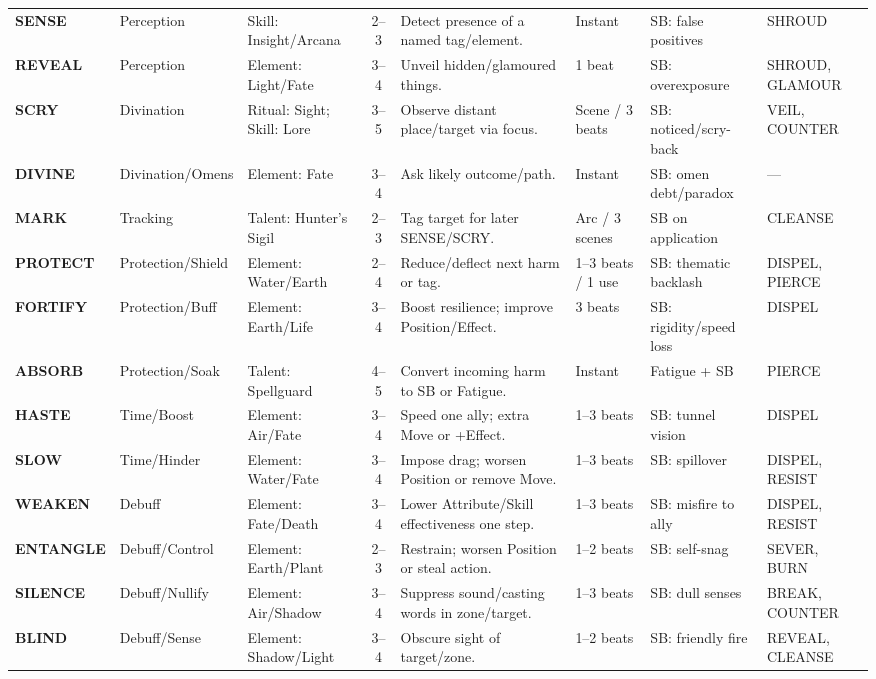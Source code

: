 \begin{longtable}{@{} l l p{4.2cm} c p{6.5cm} p{2.2cm} p{3.2cm} p{2.2cm} @{}}
\textbf{SENSE}     & Perception        & Skill: Insight/Arcana                & 2--3 & Detect presence of a named tag/element. & Instant & SB: false positives & SHROUD \\
\textbf{REVEAL}    & Perception        & Element: Light/Fate                  & 3--4 & Unveil hidden/glamoured things. & 1 beat & SB: overexposure & SHROUD, GLAMOUR \\
\textbf{SCRY}      & Divination        & Ritual: Sight; Skill: Lore           & 3--5 & Observe distant place/target via focus. & Scene / 3 beats & SB: noticed/scry-back & VEIL, COUNTER \\
\textbf{DIVINE}    & Divination/Omens  & Element: Fate                        & 3--4 & Ask likely outcome/path. & Instant & SB: omen debt/paradox & — \\
\textbf{MARK}      & Tracking          & Talent: Hunter’s Sigil               & 2--3 & Tag target for later SENSE/SCRY. & Arc / 3 scenes & SB on application & CLEANSE \\

\textbf{PROTECT}   & Protection/Shield & Element: Water/Earth                 & 2--4 & Reduce/deflect next harm or tag. & 1–3 beats / 1 use & SB: thematic backlash & DISPEL, PIERCE \\
\textbf{FORTIFY}   & Protection/Buff   & Element: Earth/Life                  & 3--4 & Boost resilience; improve Position/Effect. & 3 beats & SB: rigidity/speed loss & DISPEL \\
\textbf{ABSORB}    & Protection/Soak   & Talent: Spellguard                   & 4--5 & Convert incoming harm to SB or Fatigue. & Instant & Fatigue + SB & PIERCE \\
\textbf{HASTE}     & Time/Boost        & Element: Air/Fate                    & 3--4 & Speed one ally; extra Move or +Effect. & 1–3 beats & SB: tunnel vision & DISPEL \\
\textbf{SLOW}      & Time/Hinder       & Element: Water/Fate                  & 3--4 & Impose drag; worsen Position or remove Move. & 1–3 beats & SB: spillover & DISPEL, RESIST \\

\textbf{WEAKEN}    & Debuff            & Element: Fate/Death                  & 3--4 & Lower Attribute/Skill effectiveness one step. & 1–3 beats & SB: misfire to ally & DISPEL, RESIST \\
\textbf{ENTANGLE}  & Debuff/Control    & Element: Earth/Plant                 & 2--3 & Restrain; worsen Position or steal action. & 1–2 beats & SB: self-snag & SEVER, BURN \\
\textbf{SILENCE}   & Debuff/Nullify    & Element: Air/Shadow                  & 3--4 & Suppress sound/casting words in zone/target. & 1–3 beats & SB: dull senses & BREAK, COUNTER \\
\textbf{BLIND}     & Debuff/Sense      & Element: Shadow/Light                & 3--4 & Obscure sight of target/zone. & 1–2 beats & SB: friendly fire & REVEAL, CLEANSE \\


\end{longtable}
